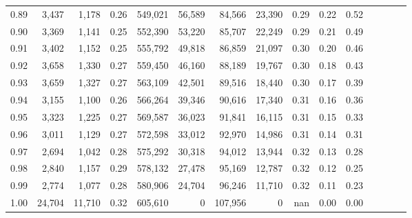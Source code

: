 \begin{tabular}{rrrcrrrrrrrrrrr}
0.89 &   3,437 &   1,178 &                                       0.26 &  549,021 &   56,589 &   84,566 &   23,390 &  0.29 &  0.22 &                         0.52 \\
0.90 &   3,369 &   1,141 &                                       0.25 &  552,390 &   53,220 &   85,707 &   22,249 &  0.29 &  0.21 &                         0.49 \\
0.91 &   3,402 &   1,152 &                                       0.25 &  555,792 &   49,818 &   86,859 &   21,097 &  0.30 &  0.20 &                         0.46 \\
0.92 &   3,658 &   1,330 &                                       0.27 &  559,450 &   46,160 &   88,189 &   19,767 &  0.30 &  0.18 &                         0.43 \\
0.93 &   3,659 &   1,327 &                                       0.27 &  563,109 &   42,501 &   89,516 &   18,440 &  0.30 &  0.17 &                         0.39 \\
0.94 &   3,155 &   1,100 &                                       0.26 &  566,264 &   39,346 &   90,616 &   17,340 &  0.31 &  0.16 &                         0.36 \\
0.95 &   3,323 &   1,225 &                                       0.27 &  569,587 &   36,023 &   91,841 &   16,115 &  0.31 &  0.15 &                         0.33 \\
0.96 &   3,011 &   1,129 &                                       0.27 &  572,598 &   33,012 &   92,970 &   14,986 &  0.31 &  0.14 &                         0.31 \\
0.97 &   2,694 &   1,042 &                                       0.28 &  575,292 &   30,318 &   94,012 &   13,944 &  0.32 &  0.13 &                         0.28 \\
0.98 &   2,840 &   1,157 &                                       0.29 &  578,132 &   27,478 &   95,169 &   12,787 &  0.32 &  0.12 &                         0.25 \\
0.99 &   2,774 &   1,077 &                                       0.28 &  580,906 &   24,704 &   96,246 &   11,710 &  0.32 &  0.11 &                         0.23 \\
1.00 &  24,704 &  11,710 &                                       0.32 &  605,610 &        0 &  107,956 &        0 &   nan &  0.00 &                         0.00 \\
\bottomrule
\end{tabular}
